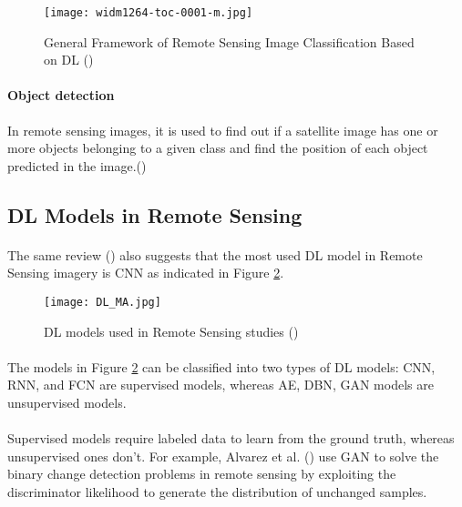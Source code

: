     \begin{figure}[hbt!]
        \centering
        \texttt{[image: widm1264-toc-0001-m.jpg]}
        \caption{General Framework of Remote Sensing Image Classification Based on \gls{DL} (\cite{https://doi.org/10.1002/widm.1264})}
        \label{fig_img_class_frame}
    \end{figure}


\paragraph{Object detection} In remote sensing images, it is used to find out if a satellite image has one or more objects belonging to a given class and find the position of each object predicted in the image.(\cite{CHENG201611})

\subsection{\gls{DL} Models in Remote Sensing} \label{dl_models_rs}
\paragraph{}
The same review (\cite{MA2019166}) also suggests that the most used \gls{DL} model in Remote Sensing imagery is \gls{CNN} as indicated in Figure \ref{fig_dl_rs}.
    \begin{figure}[hbt!]
        \centering
        \texttt{[image: DL\_MA.jpg]}
        \caption{\gls{DL} models used in Remote Sensing studies (\cite{MA2019166})}
        \label{fig_dl_rs}
    \end{figure}
    
\paragraph{}
The models in Figure \ref{fig_dl_rs} can be classified into two types of \gls{DL} models:
\gls{CNN}, \gls{RNN}, and \gls{FCN} are supervised models, whereas \gls{AE}, \gls{DBN}, \gls{GAN} models are unsupervised models. 
\paragraph{}
Supervised models require labeled data to learn from the ground truth, whereas unsupervised ones don't.  For example, Alvarez et al. (\cite{alvarez2020s2cgan}) use \gls{GAN} to solve the binary change detection problems in remote sensing by exploiting the discriminator likelihood to generate the distribution of unchanged samples.

